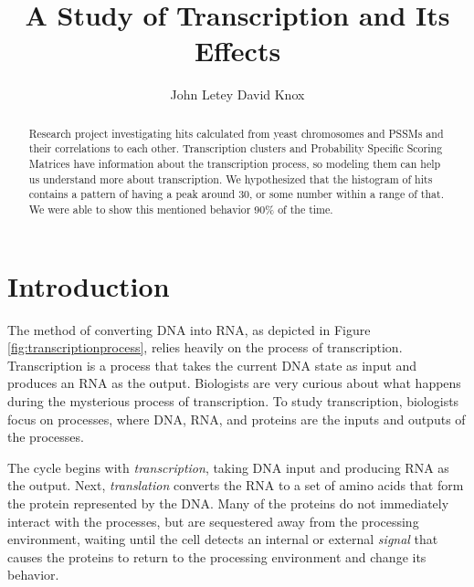 \documentclass{article}
\title{A Study of Transcription and Its Effects}
\author{
  John Letey \And David Knox
}
\newcommand{\tab}{\hspace{9mm}}
\begin{document}
\maketitle

\begin{abstract}
  Research project investigating hits calculated from yeast chromosomes and PSSMs and their correlations to each other. Transcription clusters and Probability Specific Scoring Matrices have information about the transcription process, so modeling them can help us understand more about transcription. We hypothesized that the histogram of hits contains a pattern of having a peak around 30, or some number within a range of that. We were able to show this mentioned behavior 90\% of the time.
\end{abstract}

\section{Introduction}
\tab The method of converting DNA into RNA, as depicted in Figure \ref{fig:transcriptionprocess}, relies heavily on the process of transcription. Transcription is a process that takes the current DNA state as input and produces an RNA as the output. Biologists are very curious about what happens during the mysterious process of transcription. To study transcription, biologists focus on processes, where DNA, RNA, and proteins are the inputs and outputs of the processes.

\tab The cycle begins with \textit{transcription}, taking DNA input and producing RNA as the output. Next, \textit{translation} converts the RNA to a set of amino acids that form the protein represented by the DNA. Many of the proteins do not immediately interact with the processes, but are sequestered away from the processing environment, waiting until the cell detects an internal or external \textit{signal} that causes the proteins to return to the processing environment and change its behavior.
\end{document}
